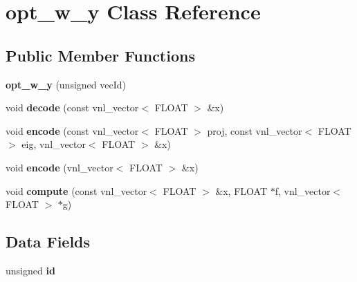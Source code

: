 \hypertarget{classopt__w__y}{
\section{opt\_\-w\_\-y Class Reference}
\label{classopt__w__y}
}
\subsection*{Public Member Functions}
\begin{DoxyCompactItemize}
\item 
\hypertarget{classopt__w__y_a8a37783e4c8197d53b11df264ad3a638}{
{\bfseries opt\_\-w\_\-y} (unsigned vecId)}
\label{classopt__w__y_a8a37783e4c8197d53b11df264ad3a638}

\item 
\hypertarget{classopt__w__y_a3ae5aa7812ecc0c688583640b3c56747}{
void {\bfseries decode} (const vnl\_\-vector$<$ FLOAT $>$ \&x)}
\label{classopt__w__y_a3ae5aa7812ecc0c688583640b3c56747}

\item 
\hypertarget{classopt__w__y_a6f0da3c4ed0a3b360f45959603d7dfe5}{
void {\bfseries encode} (const vnl\_\-vector$<$ FLOAT $>$ proj, const vnl\_\-vector$<$ FLOAT $>$ eig, vnl\_\-vector$<$ FLOAT $>$ \&x)}
\label{classopt__w__y_a6f0da3c4ed0a3b360f45959603d7dfe5}

\item 
\hypertarget{classopt__w__y_a193e2240f3ea45f2135ff4d85caf7dc1}{
void {\bfseries encode} (vnl\_\-vector$<$ FLOAT $>$ \&x)}
\label{classopt__w__y_a193e2240f3ea45f2135ff4d85caf7dc1}

\item 
\hypertarget{classopt__w__y_aac7ba155f508a57c441b2457632165e4}{
void {\bfseries compute} (const vnl\_\-vector$<$ FLOAT $>$ \&x, FLOAT $\ast$f, vnl\_\-vector$<$ FLOAT $>$ $\ast$g)}
\label{classopt__w__y_aac7ba155f508a57c441b2457632165e4}

\end{DoxyCompactItemize}
\subsection*{Data Fields}
\begin{DoxyCompactItemize}
\item 
\hypertarget{classopt__w__y_a50d6aa2bf63622320919cf7b4a294939}{
unsigned {\bfseries id}}
\label{classopt__w__y_a50d6aa2bf63622320919cf7b4a294939}

\end{DoxyCompactItemize}
